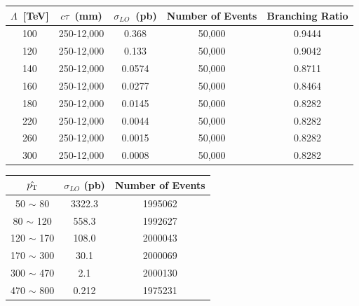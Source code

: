 \begin{center}
\centering
\begin{tabular}{|c c c c c|}
        \hline
        $\Lambda$~[TeV] & $c\tau$~(mm) & $\sigma_{LO}$~(pb) & \bfseries{Number of Events} & \bfseries{Branching Ratio}\\
       \hline
       100 & 250-12,000  & 0.368  & 50,000 & 0.9444\\
       120 & 250-12,000  & 0.133  & 50,000 & 0.9042\\
       140 & 250-12,000  & 0.0574 & 50,000 & 0.8711\\
       160 & 250-12,000  & 0.0277 & 50,000 & 0.8464\\
       180 & 250-12,000  & 0.0145 & 50,000 & 0.8282\\
       220 & 250-12,000  & 0.0044 & 50,000 & 0.8282\\
       260 & 250-12,000  & 0.0015 & 50,000 & 0.8282\\
       300 & 250-12,000  & 0.0008 & 50,000 & 0.8282\\
       \hline
       \end{tabular}  
\label{tab:mc_GMSB_sample}
\end{center}

\begin{center}
\centering
\begin{tabular}{|c c c|}
\hline
$\hat{p_{\mathrm{T}}}$ & $\sigma_{LO}$ (pb) & \bfseries{Number of Events}\\
\hline
 50 $\sim$ 80  & 3322.3  & 1995062 \\
 80 $\sim$ 120 &  558.3  & 1992627 \\
120 $\sim$ 170 &  108.0  & 2000043 \\
170 $\sim$ 300 &   30.1  & 2000069 \\
300 $\sim$ 470 &    2.1  & 2000130 \\
470 $\sim$ 800 &  0.212  & 1975231 \\
\hline
\end{tabular}
\label{tab:mc_QCD_sample}
\end{center}


